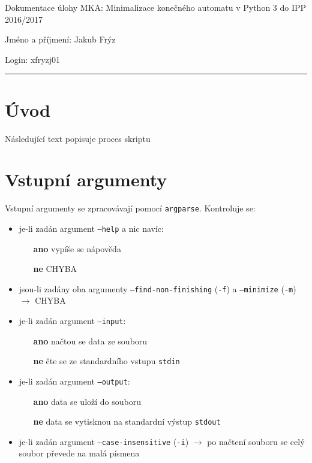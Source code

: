 \documentclass[a4paper, 11pt]{article}
\begin{document}
\begin{flushleft}

Dokumentace úlohy MKA: Minimalizace konečného automatu v Python 3 do IPP 2016/2017

Jméno a příjmení: Jakub Frýz

Login: xfryzj01

\noindent\rule{\textwidth}{0.4pt}
	
\end{flushleft}

\section*{Úvod}

Následující text popisuje proces skriptu

\section{Vstupní argumenty}

Vstupní argumenty se zpracovávají pomocí \texttt{argparse}. Kontroluje se:

\begin{itemize}
	
	\item je-li zadán argument \texttt{--help} a nic navíc:
	\begin{itemize}
		\item[\textbf{ano}] vypíše se nápověda
		\item[\textbf{ne}] CHYBA
	\end{itemize}

	\item jsou-li zadány oba argumenty \texttt{--find-non-finishing} (\texttt{-f}) a \texttt{--minimize} (\texttt{-m}) $\rightarrow$ CHYBA

	\item je-li zadán argument \texttt{--input}:
	\begin{itemize}
		\item[\textbf{ano}] načtou se data ze souboru
		\item[\textbf{ne}] čte se ze standardního vstupu \texttt{stdin}
	\end{itemize}

	\item je-li zadán argument \texttt{--output}:
	\begin{itemize}
		\item[\textbf{ano}] data se uloží do souboru
		\item[\textbf{ne}] data se vytisknou na standardní výstup \texttt{stdout}
	\end{itemize}

	\item je-li zadán argument \texttt{--case-insensitive} (\texttt{-i}) $\rightarrow$ po načtení souboru se celý soubor převede na malá písmena

\end{itemize}
\end{document}
